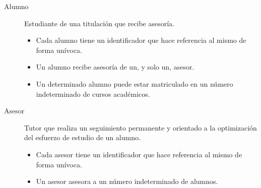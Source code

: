 \begin{description}
      \item[Alumno] Estudiante de una titulación que recibe asesoría.
      \begin{itemize}
         \item Cada alumno tiene un identificador que hace referencia al mismo
         de forma unívoca.
         \item Un alumno recibe asesoría de un, y solo un, asesor.
         \item Un determinado alumno puede estar matriculado en un número
         indeterminado de cursos académicos.
      \end{itemize}

      \item[Asesor] Tutor que realiza un seguimiento permanente y orientado a la
      optimización del esfuerzo de estudio de un alumno.
      \begin{itemize}
         \item Cada asesor tiene un identificador que hace referencia al mismo
         de forma unívoca.
         \item Un asesor asesora a un número indeterminado de alumnos.
      \end{itemize}

 \end{description}

